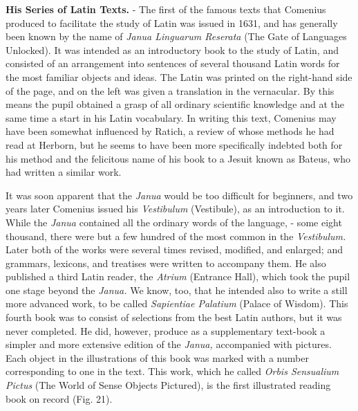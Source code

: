 \documentclass[
]{book}
\begin{document}
\textbf{His Series of Latin Texts.} - The first of the famous texts that Comenius produced to facilitate the study of Latin was issued in 1631, and has generally been known by the name of \emph{Janua Linguarum Reserata} (The Gate of Languages Unlocked). It was intended as an introductory book to the study of Latin, and consisted of an arrangement into sentences of several thousand Latin words for the most familiar objects and ideas. The Latin was printed on the right-hand side of the page, and on the left was given a translation in the vernacular. By this means the pupil obtained a grasp of all ordinary scientific knowledge and at the same time a start in his Latin vocabulary. In writing this text, Comenius may have been somewhat influenced by Ratich, a review of whose methods he had read at Herborn, but he seems to have been more specifically indebted both for his method and the felicitous name of his book to a Jesuit known as Bateus, who had written a similar work.

It was soon apparent that the \emph{Janua} would be too difficult for beginners, and two years later Comenius issued his \emph{Vestibulum} (Vestibule), as an introduction to it. While the \emph{Janua} contained all the ordinary words of the language, - some eight thousand, there were but a few hundred of the most common in the \emph{Vestibulum.} Later both of the works were several times revised, modified, and enlarged; and grammars, lexicons, and treatises were written to accompany them. He also published a third Latin reader, the \emph{Atrium} (Entrance Hall), which took the pupil one stage beyond the \emph{Janua.} We know, too, that he intended also to write a still more advanced work, to be called \emph{Sapientiae Palatium} (Palace of Wisdom). This fourth book was to consist of selections from the best Latin authors, but it was never completed. He did, however, produce as a supplementary text-book a simpler and more extensive edition of the \emph{Janua,} accompanied with pictures. Each object in the illustrations of this book was marked with a number corresponding to one in the text. This work, which he called \emph{Orbis Sensualium Pictus} (The World of Sense Objects Pictured), is the first illustrated reading book on record (Fig. 21).
\end{document}
